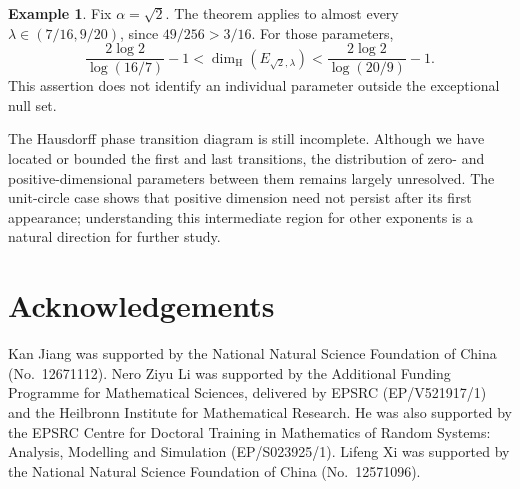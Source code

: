 \documentclass[11pt,a4paper]{amsart}
\numberwithin{equation}{section}
\theoremstyle{definition}
\newtheorem{example}[theorem]{Example}
\begin{document}
\begin{example}\label{ex:ae}
Fix \(\alpha=\sqrt2\). The theorem applies to almost every
\(\lambda\in(7/16,9/20)\), since \(49/256>3/16\).
For those parameters,
\[
\frac{2\log2}{\log(16/7)}-1
<\dim_{\mathrm H}(E_{\sqrt2,\lambda})<
\frac{2\log2}{\log(20/9)}-1.
\]
This assertion does not identify an individual parameter outside
the exceptional null set.
\end{example}


The Hausdorff phase transition diagram is still incomplete.
Although we have located or bounded the first and last transitions,
the distribution of zero- and positive-dimensional parameters between
them remains largely unresolved. The unit-circle case shows that
positive dimension need not persist after its first appearance;
understanding this intermediate region for other exponents is a
natural direction for further study.

\begingroup
\renewcommand{\addcontentsline}[3]{}
\section*{Acknowledgements}
\endgroup
Kan Jiang was supported by the National Natural Science Foundation of China
(No.~12671112).
Nero Ziyu Li was supported by the Additional Funding Programme for Mathematical
Sciences, delivered by EPSRC (EP/V521917/1) and the Heilbronn Institute for
Mathematical Research.
He was also supported by the EPSRC Centre for Doctoral Training in Mathematics
of Random Systems: Analysis, Modelling and Simulation (EP/S023925/1).
Lifeng Xi was supported by the National Natural Science Foundation of China
(No.~12571096).



\end{document}
